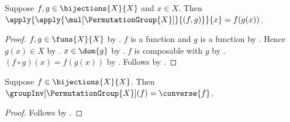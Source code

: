 \begin{proposition}\label{permutation_group_mul_value}
    Suppose $f,g\in\bijections{X}{X}$ and $x\in X$.
    Then
        $\apply{\apply{\mul[\PermutationGroup{X}]}{(f,g)}}{x}
            =f(g(x))$.
\end{proposition}
\begin{proof}
    $f,g\in\funs{X}{X}$ by .
    $f$ is a function and $g$ is a function by .
    Hence $g(x)\in X$ by .
    $x\in\dom{g}$ by .
    $f$ is composable with $g$ by .
    $(f\circ g)(x)=f(g(x))$ by .
    Follows by .
\end{proof}

\begin{proposition}\label{permutation_group_inv_apply}
    Suppose $f\in\bijections{X}{X}$.
    Then $\groupInv[\PermutationGroup{X}](f)=\converse{f}$.
\end{proposition}
\begin{proof}
    Follows by
        .
\end{proof}


